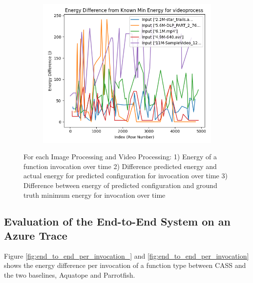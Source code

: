\documentclass[times, 10pt,twocolumn]{article}
\begin{document}
\begin{figure}[ht]
\begin{subfigure}[b]{0.3\textwidth}
     \caption{}
     \label{fig:video_energy_diff}
   \end{subfigure}
   \hfill
   \begin{subfigure}[b]{0.3\textwidth}
      \includegraphics[width=\textwidth]{imgs/final_experiment_plots/model_analysis/measurement_data_analysis/video_compare_min.png}
     \caption{}
     \label{fig:video_compare_min}
   \end{subfigure}
   
   \caption{For each Image Processing and Video Processing: 1) Energy of a function invocation over time 2) Difference predicted energy and actual energy for predicted configuration for invocation over time 3) Difference between energy of predicted configuration and ground truth minimum energy for invocation over time}
   \label{fig:model_performance_measurement_study}
 \end{figure}


  
 \subsection{Evaluation of the End-to-End System on an Azure Trace}
 \label{appendix:end-to-end_analysis}

 Figure \ref{fig:end_to_end_per_invocation_} and \ref{fig:end_to_end_per_invocation} shows the energy difference per invocation of a function type between CASS and the two baselines, Aquatope and Parrotfish. 
\end{document}
